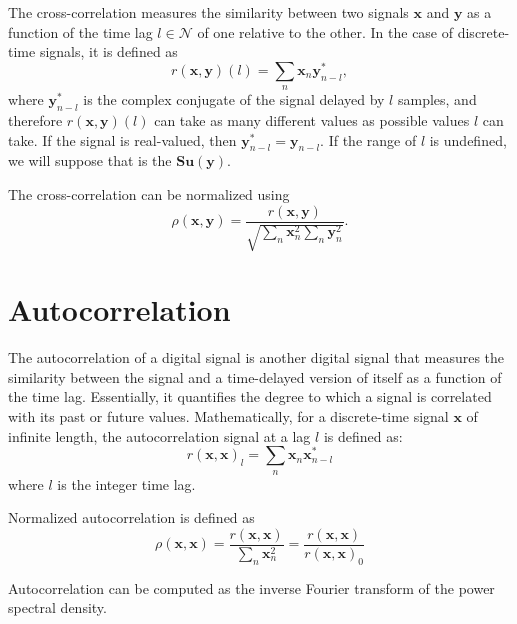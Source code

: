 The cross-correlation measures the similarity between two signals
$\mathbf{x}$ and $\mathbf{y}$ as a function of the time lag
$l\in\mathcal{N}$ of one relative to the other. In the case
of discrete-time signals, it is defined as
\begin{equation}
  {r(\mathbf{x},\mathbf{y})}(l)=\sum_n{\mathbf{x}}_n \mathbf{y}^*_{n-l},
\end{equation}
where $\mathbf{y}^* _{n-l}$ is the complex conjugate of the signal
delayed by $l$ samples, and therefore ${r(\mathbf{x},\mathbf{y})}(l)$
can take as many different values as possible values $l$ can take. If
the signal is real-valued, then
$\mathbf{y}^*_{n-l}=\mathbf{y}_{n-l}$. If the range of $l$ is
undefined, we will suppose that is the
$\mathbf{Su}(\mathbf{\mathbf{y}})$.

The cross-correlation can be normalized using
\begin{equation}
  \rho(\mathbf{x},\mathbf{y})=\frac{{r(\mathbf{x},\mathbf{y})}}{\sqrt{\sum_n \mathbf{x}_n^2 \sum_n \mathbf{y}_n^2}}.
\end{equation}


\section{Autocorrelation}
\label{sec:autocorrelation}

The autocorrelation of a digital signal is another digital signal that
measures the similarity between the signal and a time-delayed version
of itself as a function of the time lag. Essentially, it quantifies
the degree to which a signal is correlated with its past or future
values. Mathematically, for a discrete-time signal $\mathbf{x}$ of
infinite length, the autocorrelation signal at a lag $l$ is defined
as:
\begin{equation}
  {r(\mathbf{x},\mathbf{x})}_l=\sum_n{\mathbf{x}}_n \mathbf{x}^*_{n-l}
\end{equation}
where $l$ is the integer time lag.

Normalized autocorrelation is defined as
\begin{equation}
  {\rho(\mathbf{x},\mathbf{x})} = \frac{{r(\mathbf{x},\mathbf{x})}}{\sum_n \mathbf{x}_n^2} = \frac{{r(\mathbf{x},\mathbf{x})}}{{r(\mathbf{x},\mathbf{x})}_0}
\end{equation}

Autocorrelation can be computed as the inverse Fourier transform of
the power spectral density.

